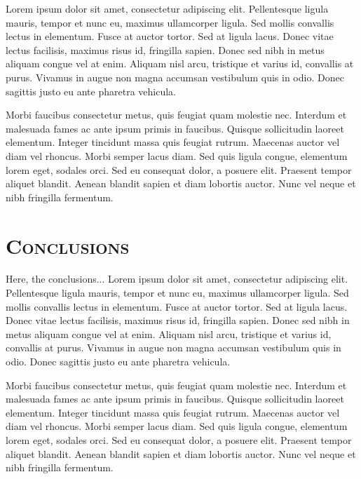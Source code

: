 \begin{multicols}{2}
 Lorem ipsum dolor sit amet, consectetur adipiscing elit. Pellentesque ligula 
mauris, tempor et nunc eu, maximus ullamcorper ligula. Sed mollis convallis 
lectus in elementum. Fusce at auctor tortor. Sed at ligula lacus. Donec vitae 
lectus facilisis, maximus risus id, fringilla sapien. Donec sed nibh in metus 
aliquam congue vel at enim. Aliquam nisl arcu, tristique et varius id, convallis 
at purus. Vivamus in augue non magna accumsan vestibulum quis in odio. Donec 
sagittis justo eu ante pharetra vehicula.

Morbi faucibus consectetur metus, quis feugiat quam molestie nec. Interdum et 
malesuada fames ac ante ipsum primis in faucibus. Quisque sollicitudin laoreet 
elementum. Integer tincidunt massa quis feugiat rutrum. Maecenas auctor vel diam 
vel rhoncus. Morbi semper lacus diam. Sed quis ligula congue, elementum lorem 
eget, sodales orci. Sed eu consequat dolor, a posuere elit. Praesent tempor 
aliquet blandit. Aenean blandit sapien et diam lobortis auctor. Nunc vel neque 
et nibh fringilla fermentum. 




\section{\textsc{Conclusions}}
\label{sec:sec04}

Here, the conclusions... 
 Lorem ipsum dolor sit amet, consectetur adipiscing elit. Pellentesque ligula 
mauris, tempor et nunc eu, maximus ullamcorper ligula. Sed mollis convallis 
lectus in elementum. Fusce at auctor tortor. Sed at ligula lacus. Donec vitae 
lectus facilisis, maximus risus id, fringilla sapien. Donec sed nibh in metus 
aliquam congue vel at enim. Aliquam nisl arcu, tristique et varius id, convallis 
at purus. Vivamus in augue non magna accumsan vestibulum quis in odio. Donec 
sagittis justo eu ante pharetra vehicula.

Morbi faucibus consectetur metus, quis feugiat quam molestie nec. Interdum et 
malesuada fames ac ante ipsum primis in faucibus. Quisque sollicitudin laoreet 
elementum. Integer tincidunt massa quis feugiat rutrum. Maecenas auctor vel diam 
vel rhoncus. Morbi semper lacus diam. Sed quis ligula congue, elementum lorem 
eget, sodales orci. Sed eu consequat dolor, a posuere elit. Praesent tempor 
aliquet blandit. Aenean blandit sapien et diam lobortis auctor. Nunc vel neque 
et nibh fringilla fermentum. 


\begingroup
     \setlength\bibindent{-16pt}
    \setlength{\bibsep}{0pt}
\scriptsize{

}
\endgroup

\end{multicols}
